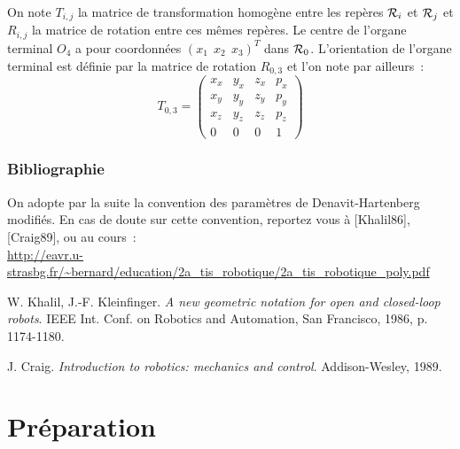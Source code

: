 \documentclass[12pt,a4paper]{article}
\def\R{{\cal R}}
\begin{document}
\medskip
On note $T_{i,j}$ la matrice de transformation homogène  entre les repères $\R_i$ et $\R_j$  et $R_{i,j}$ la matrice de rotation entre ces mêmes repères.  Le centre de l'organe terminal  $O_4$ a pour coordonnées  $(x_1 \ \ x_2 \ \ x_3)^T$  dans ${\cal R}_0$.  L'orientation de l'organe terminal est définie par la matrice de rotation $R_{0,3}$ et l'on note par ailleurs~:
\begin{equation*}
T_{0,3}=
\begin{pmatrix}
    x_{x} & y_{x} & z_{x} & p_{x}\\
    x_{y} & y_{y} & z_{y}  & p_{y}\\
    x_{z} & y_{z} & z_{z} & p_{z}\\
    0 & 0 & 0 & 1
\end{pmatrix}
\end{equation*}

\vfill

\subsubsection*{Bibliographie} 

On adopte par la suite la convention des paramètres de  Denavit-Hartenberg modifiés. 
En cas de doute sur cette convention, reportez vous à [Khalil86], [Craig89], ou au cours~:\\ {\small \url{http://eavr.u-strasbg.fr/~bernard/education/2a_tis_robotique/2a_tis_robotique_poly.pdf}}

\bigskip

\noindent [Khalil 86] W. Khalil, J.-F. Kleinfinger. \emph{A new geometric notation for open and closed-loop robots}. IEEE Int. Conf. on Robotics and Automation, San Francisco,  1986, p. 1174-1180.

\smallskip
\noindent [Craig 89] J. Craig. \emph{Introduction to robotics: mechanics and control}. Addison-Wesley, 1989.\\

\section{Préparation}
\end{document}
